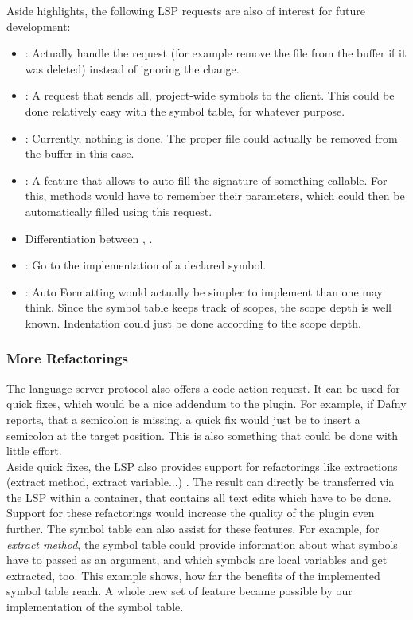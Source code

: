 Aside highlights, the following LSP requests are also of interest for future development:
\begin{itemize}
    \item {}: Actually handle the request (for example remove the file from the buffer if it was deleted) instead of ignoring the change.
    \item {}: A request that sends all, project-wide symbols to the client. This could be done relatively easy with the symbol table, for whatever purpose.
    \item {}: Currently, nothing is done. The proper file could actually be removed from the buffer in this case.
    \item {}: A feature that allows to auto-fill the signature of something callable. For this, methods would have to remember their parameters, which could then be automatically filled using this request.
    \item Differentiation between , .
    \item {}: Go to the implementation of a declared symbol.
    \item {}: Auto Formatting would actually be simpler to implement than one may think. Since the symbol table keeps track of scopes, the scope depth is well known. Indentation could just be done according to the scope depth.
\end{itemize}

\subsubsection{More Refactorings}
The language server protocol also offers a code action request.
It can be used for quick fixes, which would be a nice addendum to the plugin.
For example, if Dafny reports, that a semicolon is missing, a quick fix would just be to insert a semicolon at the target position.
This is also something that could be done with little effort.\\

Aside quick fixes, the LSP also provides support for refactorings like extractions (extract method, extract variable...) \cite{lspspec}.
The result can directly be transferred via the LSP within a  container, that contains all text edits which have to be done.
Support for these refactorings would increase the quality of the plugin even further.
The symbol table can also assist for these features.
For example, for \textit{extract method}, the symbol table could provide information about what symbols have to passed as an argument, and which symbols are local variables and get extracted, too.
This example shows, how far the benefits of the implemented symbol table reach.
A whole new set of feature became possible by our implementation of the symbol table.

